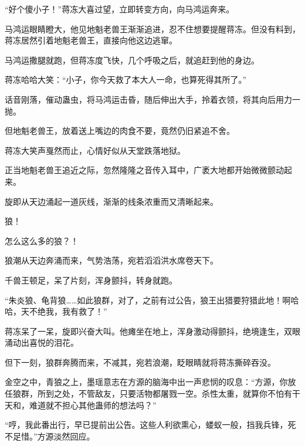 \begin{this_body}
“好个傻小子！”蒋冻大喜过望，立即转变方向，向马鸿运奔来。

马鸿运眼睛瞪大，他见地魁老兽王渐渐追进，忍不住想要提醒蒋冻。但没有料到，蒋冻居然引着地魁老兽王，直接向他这边逃窜。

马鸿运撒腿就跑，但蒋冻度飞快，几个呼吸之后，就追赶到他的身边。

蒋冻哈哈大笑：“小子，你今天救了本大人一命，也算死得其所了。”

话音刚落，催动蛊虫，将马鸿运击昏，随后伸出大手，拎着衣领，将其向后用力一抛。

但地魁老兽王，放着送上嘴边的肉食不要，竟然仍旧紧追不舍。

蒋冻大笑声戛然而止，心情好似从天堂跌落地狱。

正当地魁老兽王追近之际，忽然隆隆之音传入耳中，广袤大地都开始微微颤动起来。

旋即从天边涌起一道灰线，渐渐的线条浓重而又清晰起来。

狼！

怎么这么多的狼？！

狼潮从天边奔涌而来，气势浩荡，宛若滔滔洪水席卷天下。

千兽王顿足，呆了片刻，浑身颤抖，转身就跑。

“朱炎狼、龟背狼……如此狼群，对了，之前有过公告，狼王出猎要狩猎此地！啊哈哈，天不绝我，我有救了！”

蒋冻呆了一呆，旋即兴奋大叫。他瘫坐在地上，浑身激动得颤抖，绝境逢生，双眼涌动出喜悦的泪花。

但下一刻，狼群奔腾而来，不减其，宛若浪潮，眨眼睛就将蒋冻撕碎吞没。

金空之中，青狼之上，墨瑶意志在方源的脑海中出一声悲悯的叹息：“方源，你放任狼群，所到之处，不管敌友，只要活物都屠戮一空。杀性太重，就算你不怕有干天和，难道就不担心其他蛊师的想法吗？”

“哼，我此番出行，早已提前出公告。这些人利欲熏心，蝼蚁一般，挡我兵锋，死不足惜。”方源淡然回应。

\end{this_body}

